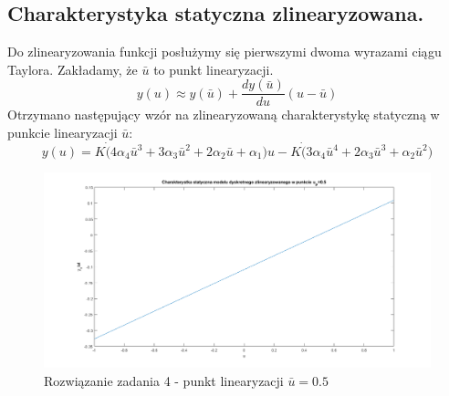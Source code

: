 \subsection{Charakterystyka statyczna zlinearyzowana.}
Do zlinearyzowania funkcji posłużymy się pierwszymi dwoma wyrazami ciągu Taylora. Zakładamy,
że $\bar{u}$ to punkt linearyzacji.
\begin{equation}
y(u) \approx y(\bar{u}) + \frac{dy(\bar{u})}{du}(u - \bar{u})
\end{equation}
Otrzymano następujący wzór na zlinearyzowaną charakterystykę statyczną w punkcie linearyzacji $\bar{u}$:
\begin{equation}
y(u) = K \dot (4\alpha_{4}\bar{u}^3 + 3\alpha_{3}\bar{u}^2 + 2\alpha_{2}\bar{u} + \alpha_{1})u - K \dot (3\alpha_{4}\bar{u}^4 + 2\alpha_{3}\bar{u}^3 + \alpha_{2}\bar{u}^2)
\end{equation}
\begin{figure}[H]
\centering
\includegraphics[width=15cm]{images/5.png}
\caption{Rozwiązanie zadania 4 - punkt linearyzacji $\bar{u}=0.5$}
\label{fig:5}
\end{figure}
